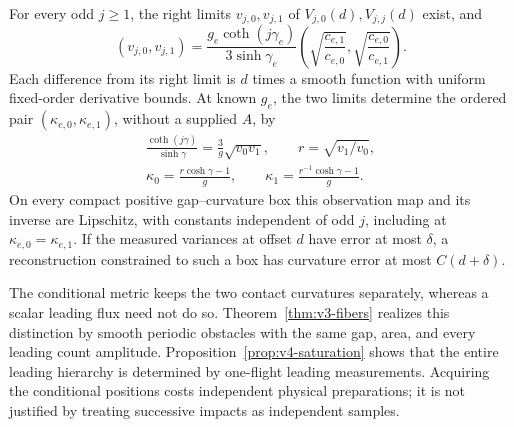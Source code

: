 \begin{theorem}
\label{thm:v3-tomography}
For every odd $j\ge1$, the right limits $v_{j,0},v_{j,1}$ of
$V_{j,0}(d),V_{j,j}(d)$ exist, and
\begin{equation}\label{eq:v3-variance-limits}
 (v_{j,0},v_{j,1})=
 \frac{g_e\coth(j\gamma_e)}{3\sinh\gamma_e}
 \left(\sqrt{\frac{c_{e,1}}{c_{e,0}}},
       \sqrt{\frac{c_{e,0}}{c_{e,1}}}\right).
\end{equation}
Each difference from its right limit is $d$ times a smooth function with
uniform fixed-order derivative bounds. At known $g_e$, the two limits
determine the ordered pair $(\kappa_{e,0},\kappa_{e,1})$, without a
supplied $A$, by
\begin{equation}\label{eq:v3-inverse-map}
 \begin{gathered}
 \frac{\coth(j\gamma)}{\sinh\gamma}
     =\frac3g\sqrt{v_0v_1},\qquad r=\sqrt{v_1/v_0},\\
 \kappa_0=\frac{r\cosh\gamma-1}{g},\qquad
 \kappa_1=\frac{r^{-1}\cosh\gamma-1}{g}.
 \end{gathered}
\end{equation}
On every compact positive gap--curvature box this observation map and
its inverse are Lipschitz, with constants independent of odd $j$,
including at $\kappa_{e,0}=\kappa_{e,1}$. If the measured variances at
offset $d$ have error at most $\delta$, a reconstruction constrained to
such a box has curvature error at most $C(d+\delta)$.
\end{theorem}

The conditional metric keeps the two contact curvatures separately,
whereas a scalar leading flux need not do so. Theorem~\ref{thm:v3-fibers}
realizes this distinction by smooth periodic obstacles with the same
gap, area, and every leading count amplitude. Proposition~\ref{prop:v4-saturation}
shows that the entire leading hierarchy is determined by one-flight
leading measurements. Acquiring the conditional positions costs
independent physical preparations; it is not justified by treating
successive impacts as independent samples.

